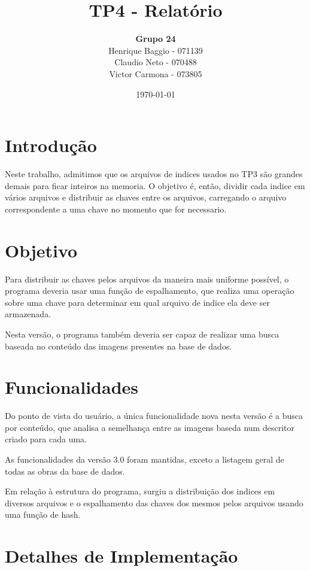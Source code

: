 \title{\textbf{TP4 - Relatório}}
\author{\textbf{Grupo 24} \\
 Henrique Baggio - 071139 \\
 Claudio Neto - 070488 \\
 Victor Carmona - 073805}
 
\date{\today}


\maketitle

\section{Introdução}
Neste trabalho, admitimos que os arquivos de indices usados no TP3 são grandes
demais para ficar inteiros na memoria. O objetivo é, então, dividir cada
indice em vários arquivos e distribuir as chaves entre os arquivos,
carregando o arquivo correspondente a uma chave no momento que for
necessario.

\section{Objetivo}
Para distribuir as chaves pelos arquivos da maneira mais uniforme possível,
o programa deveria usar uma função de espalhamento, que realiza uma operação
sobre uma chave para determinar em qual arquivo de indice ela deve ser armazenada.

Nesta versão, o programa também deveria ser capaz de realizar uma busca baseada
no conteúdo das imagens presentes na base de dados.

\section{Funcionalidades}
Do ponto de vista do usuário, a única funcionalidade nova nesta versão é a
busca por conteúdo, que analisa a semelhança entre as imagens baseda num
descritor criado para cada uma.

As funcionalidades da versão 3.0 foram mantidas, exceto a listagem geral de
todas as obras da base de dados.

Em relação à estrutura do programa, surgiu a distribuição dos indices em
diversos arquivos e o espalhamento das chaves dos mesmos pelos arquivos usando
uma função de hash.

\section{Detalhes de Implementação}
